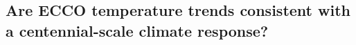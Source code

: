 \documentclass[authoryear,round,12pt]{article}
\begin{document}








\subsection{Are ECCO temperature trends consistent with a centennial-scale climate response?}
\end{document}
